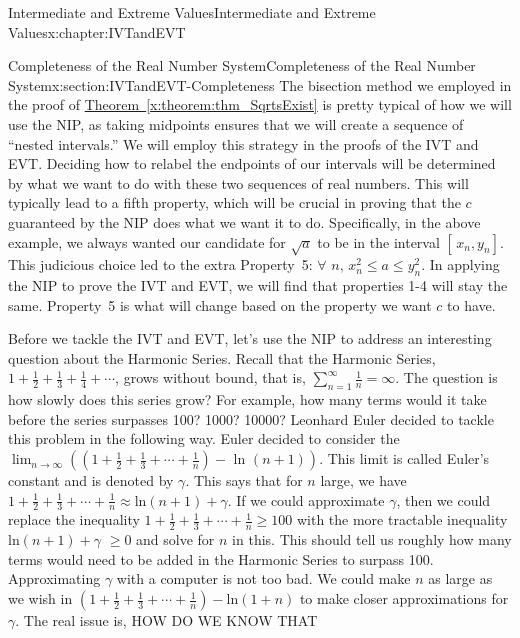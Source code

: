 \begin{chapterptx}{Intermediate and Extreme Values}{}{Intermediate and Extreme Values}{}{}{x:chapter:IVTandEVT}
\begin{sectionptx}{Completeness of the Real Number System}{}{Completeness of the Real Number System}{}{}{x:section:IVTandEVT-Completeness}
		The bisection method we employed in the proof of \hyperref[x:theorem:thm_SqrtsExist]{Theorem~{\xreffont\ref{x:theorem:thm_SqrtsExist}}} is pretty typical of how we will use the NIP, as taking midpoints ensures that we will create a sequence of ``nested intervals.'' We will employ this strategy in the proofs of the IVT and EVT. Deciding how to relabel the endpoints of our intervals will be determined by what we want to do with these two sequences of real numbers. This will typically lead to a fifth property, which will be crucial in proving that the \(c\) guaranteed by the NIP does what we want it to do. Specifically, in the above example, we always wanted our candidate for \(\sqrt{a}\) to be in the interval \([\,x_n,y_n]\). This judicious choice led to the extra Property~5: \(\forall\) \(n,\,x_n^2\leq a\leq y_n^2\). In applying the NIP to prove the IVT and EVT, we will find that properties 1-4 will stay the same. Property~5 is what will change based on the property we want \(c\) to have.%
		\par
		Before we tackle the IVT and EVT, let's use the NIP to address an interesting question about the Harmonic Series.  Recall that the Harmonic Series, \(1+\frac{1}{2}+\frac{1}{3}+\frac{1}{4}+\cdots\), grows without bound, that is, \(\sum_{n=1}^\infty\frac{1}{n}=\infty\).  The question is how slowly does this series grow?  For example, how many terms would it take before the series surpasses 100? 1000? 10000?  Leonhard Euler  decided to tackle this problem in the following way.  Euler decided to consider the \(\lim_{n\rightarrow\infty}\left(\left(1+\frac{1}{2}+\frac{1}{3}+\cdots+
		\frac{1}{n}\right)-\text{ ln } \left(n+1\right)\right)\).  This limit is called Euler's constant and is denoted by \(\gamma\). This says that for \(n\) large, we have \(1+\frac{1}{2}+\frac{1}{3}+\cdots+\frac{1}{n}\approx\)ln\(\left(n+1\right)+\gamma\). If we could approximate \(\gamma\), then we could replace the inequality \(1+\frac{1}{2}+\frac{1}{3}+\cdots+\frac{1}{n}\geq
		100\) with the more tractable inequality ln\(\left(n+1\right)+\gamma\) \(\geq 0\) and solve for \(n\) in this.  This should tell us roughly how many terms would need to be added in the Harmonic Series to surpass 100. Approximating \(\gamma\) with a computer is not too bad.  We could make \(n\) as large as we wish in \(\left(1+\frac{1}{2}+\frac{1}{3}+\cdots+\frac{1}{n}\right)-\)ln\(\left(1+n\right)\) to make closer approximations for \(\gamma\).  The real issue is, \alert{HOW DO WE KNOW THAT}%
		\begin{equation*}

\end{equation*}
\end{sectionptx}
\end{chapterptx}
